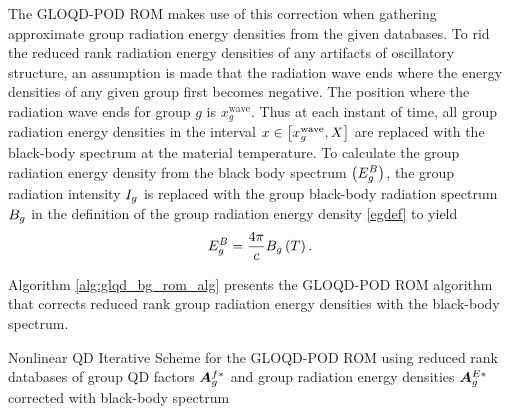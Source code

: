 	\ind The GLOQD-POD ROM makes use of this correction when gathering approximate group radiation energy densities from the given databases. To rid the reduced rank radiation energy densities of any artifacts of oscillatory structure, an assumption is made that the radiation wave ends where the energy densities of any given group first becomes negative. The position where the radiation wave ends for group $g$ is $x^{\text{wave}}_{g}$. Thus at each instant of time, all group radiation energy densities in the interval $x\in\left[x^{\text{wave}}_{g},X\right]$ are replaced with the black-body spectrum at the material temperature. To calculate the group radiation energy density from the black body spectrum $\left( E^B_g\right)$, the group radiation intensity $I_{g}$ is replaced with the group black-body radiation spectrum $B_{g}$ in the definition of the group radiation energy density \eqref{egdef} to yield
	\begin{equation}
		E^B_g = \frac{4\pi}{ c}B_{g}\left( T\right).
	\end{equation}
	
	Algorithm \ref{alg:glqd_bg_rom_alg} presents the GLOQD-POD ROM algorithm that corrects reduced rank group radiation energy densities with the black-body spectrum.
	
	\begin{algorithm}[ht!]
		\SetAlgoLined
		\caption{Nonlinear QD Iterative Scheme for the GLOQD-POD ROM using reduced rank databases of group QD factors $\bm{A}^{f*}_g$ and group radiation energy densities $\bm{A}^{E*}_g$ corrected with black-body spectrum \label{alg:glqd_bg_rom_alg}}
	\end{algorithm}

